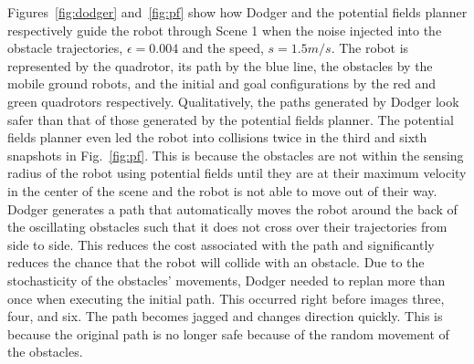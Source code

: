 Figures~\ref{fig:dodger} and~\ref{fig:pf} show how Dodger and the potential
fields planner respectively guide the robot through Scene 1 when the noise
injected into the obstacle trajectories, $\epsilon = 0.004$ and the speed, $s =
1.5 m/s$. The robot is represented by the quadrotor, its path by the blue line,
the obstacles by the mobile ground robots, and the initial and goal
configurations by the red and green quadrotors respectively. Qualitatively, the
paths generated by Dodger look safer than that of those generated by the
potential fields planner.  The potential fields planner even led the robot into
collisions twice in the third and sixth snapshots in Fig.~\ref{fig:pf}. This is
because the obstacles are not within the sensing radius of the robot using
potential fields until they are at their maximum velocity in the center of the
scene and the robot is not able to move out of their way. Dodger generates a
path that automatically moves the robot around the back of the oscillating
obstacles such that it does not cross over their trajectories from side to
side. This reduces the cost associated with the path and significantly reduces
the chance that the robot will collide with an obstacle. Due to the
stochasticity of the obstacles' movements, Dodger needed to replan more than
once when executing the initial path. This occurred right before images three,
four, and six. The path becomes jagged and changes direction quickly. This is
because the original path is no longer safe because of the random movement of
the obstacles.

